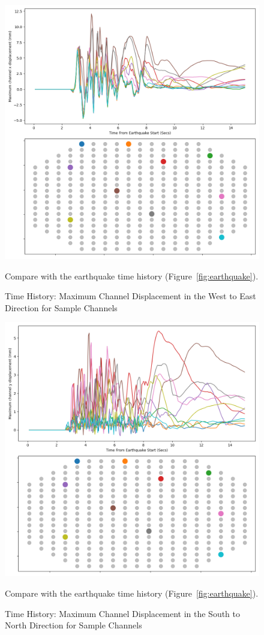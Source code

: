 \begin{figure}[p]
	\centering
	\includegraphics[scale=0.45]{Figures/time_history.png}
	\caption{Time History: Maximum Channel Displacement in the West to East Direction for Sample Channels} {Compare with the earthquake time history (Figure~\ref{fig:earthquake}).}
	\label{fig:time_history_1}
\end{figure}

\begin{figure}[p]
	\centering
	\includegraphics[scale=0.45]{Figures/time_history_y.png}
	\caption{Time History: Maximum Channel Displacement in the South to North Direction for Sample Channels } {Compare with the earthquake time history (Figure~\ref{fig:earthquake}).}
	\label{fig:time_history_2}
\end{figure}

